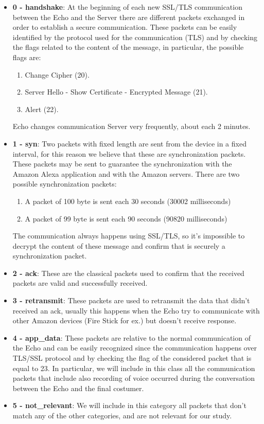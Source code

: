 \documentclass[sigconf]{acmart}
\begin{document}
\begin{itemize}
  \item \textbf{0 - handshake}: At the beginning of each new SSL/TLS communication between the Echo and the Server there are different packets exchanged in order to establish a secure communication.
  These packets can be easily identified by the protocol used for the communication (TLS) and by checking the flags related to the content of the message, in particular, the possible flags are:
  \begin{enumerate}
    \item Change Cipher (20).
    \item Server Hello - Show Certificate - Encrypted Message (21).
    \item Alert (22).
  \end{enumerate}
  Echo changes communication Server very frequently, about each 2 minutes.
  \item \textbf{1 - syn}: Two packets with fixed length are sent from the device in a fixed interval, for this reason we believe that these are synchronization packets.
  These packets may be sent to guarantee the synchronization with the Amazon Alexa application and with the Amazon servers.
  There are two possible synchronization packets:
  \begin{enumerate}
    \item A packet of 100 byte is sent each 30 seconds (30002 milliseconds)
    \item A packet of 99 byte is sent each 90 seconds (90820 milliseconds)
  \end{enumerate}
  The communication always happens using SSL/TLS, so it's impossible to decrypt the content of these message and confirm that is securely a synchronization packet.
  \item \textbf{2 - ack}: These are the classical packets used to confirm that the received packets are valid and successfully received.
  \item \textbf{3 - retransmit}: These packets are used to retransmit the data that didn't received an ack, usually this happens when the Echo try to communicate with other Amazon devices (Fire Stick for ex.) but doesn't receive response.
  \item \textbf{4 - app\_data}: These packets are relative to the normal communication of the Echo and can be easily recognized since the communication happens over TLS/SSL protocol and by checking the flag of the considered packet that is equal to 23.
  In particular, we will include in this class all the communication packets that include also recording of voice occurred during the conversation between the Echo and the final costumer.
  \item \textbf{5 - not\_relevant}: We will include in this category all packets that don't match any of the other categories, and are not relevant for our study.
\end{itemize}
\end{document}
